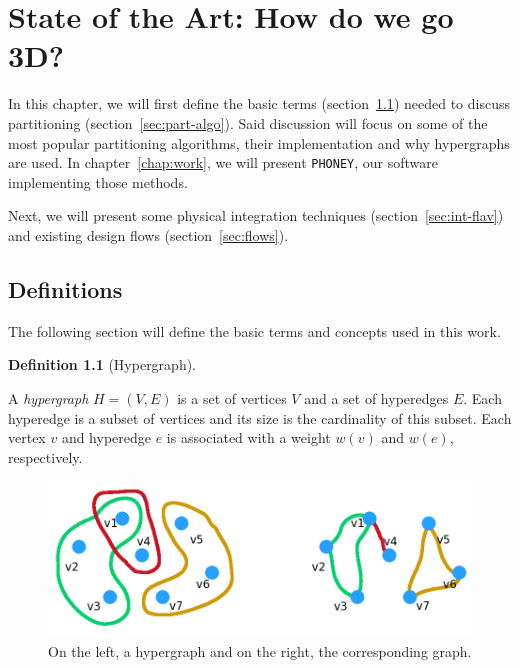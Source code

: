 \documentclass[11pt,a4paper]{report} %
\theoremstyle{customdef}
\newtheorem{definition}{Definition}
\newenvironment{defi}[2]
 {\begin{definition}[#1]\label{#2}\end{definition}\begin{siderules}}
 {\end{siderules}}
\begin{document}

\chapter{State of the Art: How do we go 3D?}\label{chap:soa}

In this chapter, we will first define the basic terms (section~\ref{sec:def}) needed to discuss partitioning (section~\ref{sec:part-algo}).
Said discussion will focus on some of the most popular partitioning algorithms, their implementation and why hypergraphs are used.
In chapter~\ref{chap:work}, we will present \texttt{PHONEY}, our software implementing those methods.

Next, we will present some physical integration techniques (section~\ref{sec:int-flav}) and existing design flows (section~\ref{sec:flows}).






\section{Definitions}\label{sec:def}
The following section will define the basic terms and concepts used in this work.

\begin{defi}{Hypergraph}{def:hypergraph}
A \emph{hypergraph} $H = (V, E)$ is a set of vertices $V$ and a set of hyperedges $E$.
Each hyperedge is a subset of vertices and its size is the cardinality of this subset.
Each vertex $v$ and hyperedge $e$ is associated with a weight $w(v)$ and $w(e)$, respectively.
\end{defi}

\begin{figure}[!h]
\centering
\includegraphics[width=.9\textwidth]{img/hypergraph-graph.png}
\caption{On the left, a hypergraph and on the right, the corresponding graph.}
\label{fig:hypergraph-graph}
\end{figure}
\end{document}
